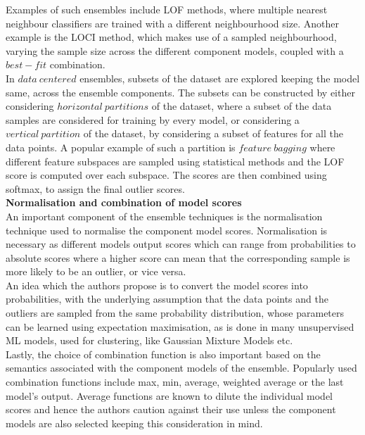 Examples of such ensembles include LOF methods, where multiple nearest neighbour classifiers are trained with a different neighbourhood size. Another example is the LOCI method, which makes use of a sampled neighbourhood, varying the sample size across the different component models, coupled with a $best-fit$ combination. \\

In $data\ centered$ ensembles, subsets of the dataset are explored keeping the model same, across the ensemble components. The subsets can be constructed by either considering $horizontal\ partitions$ of the dataset, where a subset of the data samples are considered for training by every model, or considering a $vertical\ partition$ of the dataset, by considering a subset of features for all the data points. A popular example of such a partition is $feature\ bagging$ where different feature subspaces are sampled using statistical methods and the LOF score is computed over each subspace. The scores are then combined using softmax, to assign the final outlier scores. \\

\noindent \textbf{Normalisation and combination of model scores} \\

An important component of the ensemble techniques is the normalisation technique used to normalise the component model scores. Normalisation is necessary as different models output scores which can range from probabilities to absolute scores where a higher score can mean that the corresponding sample is more likely to be an outlier, or vice versa. \\ 

An idea which the authors propose is to convert the model scores into probabilities, with the underlying assumption that the data points and the outliers are sampled from the same probability distribution, whose parameters can be learned using expectation maximisation, as is done in many unsupervised ML models, used for clustering, like Gaussian Mixture Models etc. \\

Lastly, the choice of combination function is also important based on the semantics associated with the component models of the ensemble. Popularly used combination functions include max, min, average, weighted average or the last model's output. Average functions are known to dilute the individual model scores and hence the authors caution against their use unless the component models are also selected keeping this consideration in mind. 

